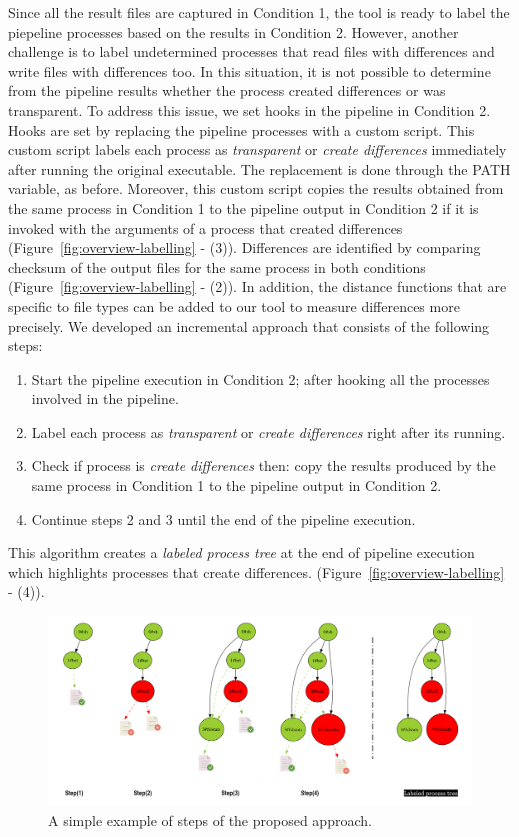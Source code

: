 \documentclass[a4paper,num-refs]{oup-contemporary}
\begin{document}
Since all the result files are captured in Condition 1, the tool 
is ready to label the piepeline processes based on the results in Condition 2.
However, another challenge is to label undetermined processes that read files with 
differences and write files with differences too. In this
situation, it is not possible to determine from the pipeline results 
whether the process created differences or 
was transparent.
To address this issue, we set hooks in the pipeline 
in Condition 2. Hooks are set by replacing the pipeline 
processes with a custom script. This custom script labels each process 
as \emph{transparent} or \emph{create differences} immediately after running 
the original executable. 
The replacement is done through the PATH variable, as before. Moreover, 
this custom script copies the results obtained from the same process in 
Condition 1 to the pipeline output in Condition 2 if 
it is invoked with the arguments of a process that created differences 
(Figure~\ref{fig:overview-labelling} - (3)). 
Differences are identified by comparing checksum of the output files for 
the same process in both conditions (Figure~\ref{fig:overview-labelling} - (2)).
In addition, the distance functions that are specific to file types can be added 
to our tool to measure differences more precisely. 
We developed an incremental approach that consists of the following steps: 

\begin{enumerate}
  \item Start the pipeline execution in Condition 2; 
        after hooking all the processes involved in the pipeline.
  \item Label each process as \emph{transparent} or \emph{create differences} 
        right after its running.
  \item Check if process is \emph{create differences} then: 
        copy the results produced by the same process in Condition 1 to the 
        pipeline output in Condition 2. 
  \item Continue steps 2 and 3 until the end of the pipeline execution.
\end{enumerate}

This algorithm creates a \emph{labeled process tree} at the end of pipeline execution 
which highlights processes that create differences.
(Figure~\ref{fig:overview-labelling} - (4)).

\begin{figure}
  \centering
  \includegraphics[width=\columnwidth]{images/iterative_modif}
  \caption{A simple example of steps of the proposed approach.}
  \label{fig:iterations}
\end{figure}
\end{document}
